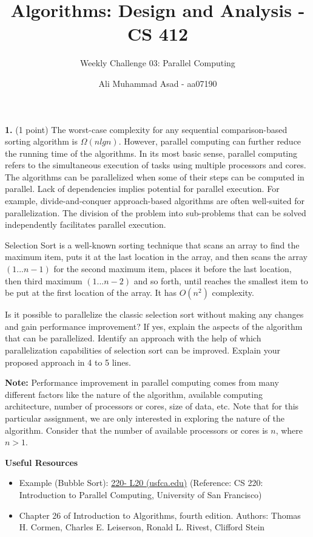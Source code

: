 \documentclass[addpoints]{exam}
\title{Algorithms: Design and Analysis - CS 412 \vspace*{-4mm}}
\author{Weekly Challenge 03: Parallel Computing}
\date{\vspace*{-4mm} Ali Muhammad Asad - aa07190}
\begin{document}
\maketitle


\begin{questions}
  \question[1]
  \textbf{1.}\; (1 point) The worst-case complexity for any sequential comparison-based sorting algorithm is $\Omega(nlgn)$. However, parallel computing can further reduce the running time of the algorithms. In its most basic sense, parallel computing refers to the simultaneous execution of tasks using multiple processors and cores. The algorithms can be parallelized when some of their steps can be computed in parallel. Lack of dependencies implies potential for parallel execution. For example, divide-and-conquer approach-based algorithms are often well-suited for parallelization. The division of the problem into sub-problems that can be solved independently facilitates parallel execution.

  Selection Sort is a well-known sorting technique that scans an array to find the maximum item, puts it at the last location in the array, and then scans the array $(1 . . . n - 1)$ for the second maximum item, places it before the last location, then third maximum $(1 . . . n - 2)$ and so forth, until reaches the smallest item to be put at the first location of the array. It has $O(n^2)$ complexity.

  Is it possible to parallelize the classic selection sort without making any changes and gain performance improvement? If yes, explain the aspects of the algorithm that can be parallelized. Identify an approach with the help of which parallelization capabilities of selection sort can be improved. Explain your proposed approach in 4 to 5 lines.

  \textbf{Note:} Performance improvement in parallel computing comes from many different factors like the nature of the algorithm, available computing architecture, number of processors or cores, size of data, etc. Note that for this particular assignment, we are only interested in exploring the nature of the algorithm. Consider that the number of available processors or cores is $n$, where $n > 1$.

  \textbf{Useful Resources}
  \begin{itemize}
    \item Example (Bubble Sort):
          \href{https://www.cs.usfca.edu/~mmalensek/cs220/schedule/lectures/220-L20.pdf}{220-
            L20 (usfca.edu)} (Reference: CS 220: Introduction to Parallel Computing, University
          of San Francisco)
    \item Chapter 26 of Introduction to Algorithms, fourth edition. Authors: Thomas
          H. Cormen, Charles E. Leiserson, Ronald L. Rivest, Clifford Stein
  \end{itemize}


\end{questions}
\end{document}
